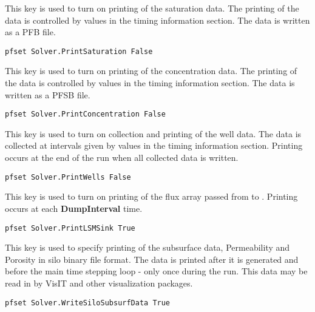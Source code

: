 {
This key is used to turn on printing of the saturation data.
The printing of the data is controlled by values in the
timing information section.  The data is written as a PFB file.
}
\begin{display}\begin{verbatim}
pfset Solver.PrintSaturation False
\end{verbatim}\end{display}

{
This key is used to turn on printing of the concentration data.
The printing of the data is controlled by values in the
timing information section.  The data is written as a PFSB file.
}
\begin{display}\begin{verbatim}
pfset Solver.PrintConcentration False
\end{verbatim}\end{display}

{
This key is used to turn on collection and printing of the
well data.  The data is collected at intervals given by values
in the timing information section.  Printing occurs at the
end of the run when all collected data is written.
}
\begin{display}\begin{verbatim}
pfset Solver.PrintWells False
\end{verbatim}\end{display}

{
This key is used to turn on printing of the
flux array passed from  to \parflow{}.   Printing occurs at each {\bf DumpInterval} time.
}
\begin{display}\begin{verbatim}
pfset Solver.PrintLSMSink True
\end{verbatim}\end{display}

{
This key is used to specify printing of the subsurface data,
Permeability and Porosity in silo binary file format.  The data is printed after it is
generated and before the main time stepping loop - only once
during the run.  This data may be read in by VisIT and other visualization packages.
}
\begin{display}\begin{verbatim}
pfset Solver.WriteSiloSubsurfData True
\end{verbatim}\end{display}

